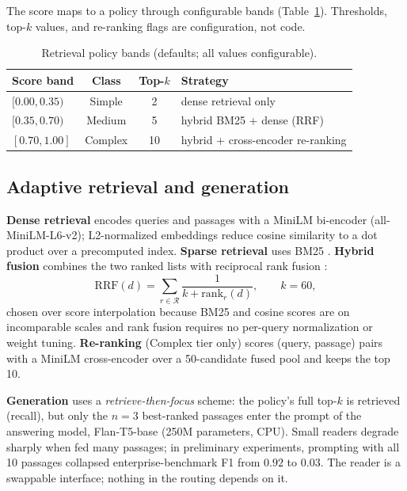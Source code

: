 \documentclass[11pt]{article}
\begin{document}
The score maps to a policy through configurable bands
(Table~\ref{tab:policy}). Thresholds, top-$k$ values, and re-ranking flags are
configuration, not code.

\begin{table}[t]
\centering\small
\begin{tabular}{lccl}
\toprule
Score band & Class & Top-$k$ & Strategy \\
\midrule
$[0.00, 0.35)$ & Simple & 2 & dense retrieval only \\
$[0.35, 0.70)$ & Medium & 5 & hybrid BM25 + dense (RRF) \\
$[0.70, 1.00]$ & Complex & 10 & hybrid + cross-encoder re-ranking \\
\bottomrule
\end{tabular}
\caption{Retrieval policy bands (defaults; all values configurable).}
\label{tab:policy}
\end{table}

\subsection{Adaptive retrieval and generation}
\label{sec:retrieval}

\textbf{Dense retrieval} encodes queries and passages with a MiniLM bi-encoder
\citep{reimers2019sbert} (all-MiniLM-L6-v2); L2-normalized embeddings reduce
cosine similarity to a dot product over a precomputed index.
\textbf{Sparse retrieval} uses BM25 \citep{robertson2009bm25}.
\textbf{Hybrid fusion} combines the two ranked lists with reciprocal rank
fusion \citep{cormack2009rrf}:
\begin{equation}
\mathrm{RRF}(d) = \sum_{r \in \mathcal{R}} \frac{1}{k + \mathrm{rank}_r(d)},
\qquad k = 60,
\end{equation}
chosen over score interpolation because BM25 and cosine scores are on
incomparable scales and rank fusion requires no per-query normalization or
weight tuning. \textbf{Re-ranking} (Complex tier only) scores
(query, passage) pairs with a MiniLM cross-encoder
\citep{nogueira2019rerank} over a 50-candidate fused pool and keeps the top
10.

\textbf{Generation} uses a \emph{retrieve-then-focus} scheme: the policy's
full top-$k$ is retrieved (recall), but only the $n{=}3$ best-ranked passages
enter the prompt of the answering model, Flan-T5-base \citep{chung2024flan}
(250M parameters, CPU). Small readers degrade sharply when fed many passages;
in preliminary experiments, prompting with all 10 passages collapsed
enterprise-benchmark F1 from $0.92$ to $0.03$. The reader is a swappable
interface; nothing in the routing depends on it.
\end{document}
